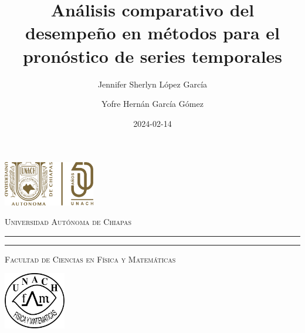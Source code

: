 \documentclass[
  us-letterpaper,
]{scrreprt}
\title{Análisis comparativo del desempeño en métodos para el pronóstico
de series temporales}
\author{Jennifer Sherlyn López García \and Yofre Hernán García Gómez}
\date{2024-02-14}
\begin{document}
\begin{titlepage}
\hspace{-1.7cm} %
\begin{minipage}[t][0.03\textheight][c]{0.22\textwidth}
        \includegraphics[width=4.0cm]{LOGO50.png}
\end{minipage}\hspace{0.9cm}
\begin{minipage}[t][0.03\textheight][c]{0.69\textwidth}
\begin{center}
                \textsc{\huge Universidad Autónoma de Chiapas}\\[0.3cm]
                \hrule height 2.5pt
                \vspace{0.2cm}
                \hrule height1pt
                \vspace{0.3cm}
                \textsc{\Large Facultad de Ciencias en Física y Matemáticas}
\end{center}
\end{minipage}\hspace{0.2cm}
\begin{minipage}[t][0.03\textheight][c]{0.2\textwidth}
		\includegraphics[width=2.7cm]{logofcfm.png}
\end{minipage}\\
\begin{minipage}[t][0.93\textheight][c]{0.06\textwidth}
\vspace{60pt}
    \begin{center}
        \vrule width1pt height18cm
        \vspace{5mm}
        \vrule width2.5pt height18cm
        \vspace{5mm}
        \vrule width1pt height18cm
   \end{center}
\end{minipage}\hspace{1.3cm} %
\begin{minipage}[t][0.95\textheight][c]{0.76\textwidth}


\end{minipage}
\end{titlepage}
\end{document}
